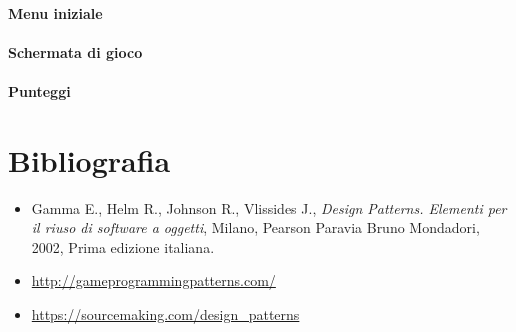 \documentclass[a4paper,12pt, hidelinks]{report}
\begin{document}
\subsubsection{Menu iniziale}

\subsubsection{Schermata di gioco}

\subsubsection{Punteggi}

\chapter{Bibliografia}

\begin{itemize}
	\item Gamma E., Helm R., Johnson R., Vlissides J., \emph{Design Patterns. Elementi per il riuso di software a oggetti}, Milano, Pearson Paravia Bruno Mondadori, 2002, Prima edizione italiana.
	\item \href{http://gameprogrammingpatterns.com/}{http://gameprogrammingpatterns.com/}
	\item \href{https://sourcemaking.com/design\_patterns}{https://sourcemaking.com/design\_patterns}
	
\end{itemize}




%
%
\end{document}
